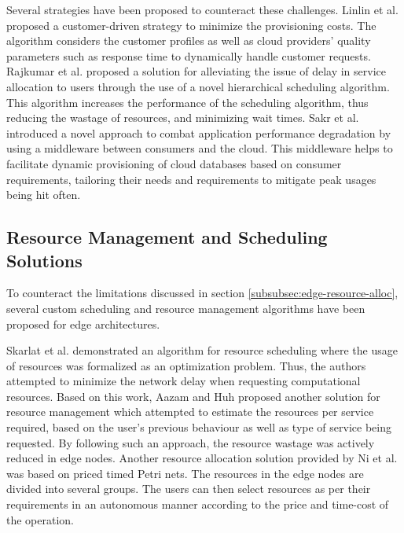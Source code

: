 Several strategies have been proposed to counteract these challenges. Linlin et al. \cite{wu2013sla} proposed a customer-driven strategy  to minimize the provisioning costs. The algorithm considers the customer profiles as well as cloud providers' quality parameters such as response time to dynamically handle customer requests. Rajkumar et al. \cite{rajavel2012achieving} proposed a solution for alleviating the issue of delay in service allocation to users through the use of a novel hierarchical scheduling algorithm. This algorithm increases the performance of the scheduling algorithm, thus reducing the wastage of resources, and minimizing wait times. Sakr et al. \cite{sakr2012sla} introduced a novel approach to combat application performance degradation by using a middleware between consumers and the cloud. This middleware helps to facilitate dynamic provisioning of cloud databases based on consumer requirements, tailoring their needs and requirements to mitigate peak usages being hit often.

\subsection{Resource Management and Scheduling Solutions}
\label{subsec:resource-schedule-solutions}

To counteract the limitations discussed in section \ref{subsubsec:edge-resource-alloc}, several custom scheduling and resource management algorithms have been proposed for edge architectures.\par

Skarlat et al. \cite{skarlat2016resource} demonstrated an algorithm for resource scheduling where the usage of resources was formalized as an optimization problem. Thus, the authors attempted to minimize the network delay when requesting computational resources. Based on this work, Aazam and Huh \cite{aazam2015dynamic} proposed another solution for resource management which attempted to estimate the resources per service required, based on the user's previous behaviour as well as type of service being requested. By following such an approach, the resource wastage was actively reduced in edge nodes. Another resource allocation solution provided by Ni et al. \cite{ni2017resource} was based on priced timed Petri nets. The resources in the edge nodes are divided into several groups. The users can then select resources as per their requirements in an autonomous manner according to the price and time-cost of the operation.\par

